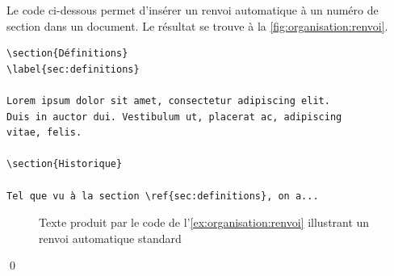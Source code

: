 \begin{exemple}
  \label{ex:organisation:renvoi}
  Le code ci-dessous permet d'insérer un renvoi automatique à un
  numéro de section dans un document. Le résultat se trouve à la
  \autoref{fig:organisation:renvoi}.
\begin{lstlisting}[emph={\label,\ref}]
\section{Définitions}
\label{sec:definitions}

Lorem ipsum dolor sit amet, consectetur adipiscing elit.
Duis in auctor dui. Vestibulum ut, placerat ac, adipiscing
vitae, felis.

\section{Historique}

Tel que vu à la section \ref{sec:definitions}, on a...
\end{lstlisting}

  \begin{figure}
    \caption{Texte produit par le code de
      l'\autoref{ex:organisation:renvoi} illustrant un renvoi
      automatique standard}
    \label{fig:organisation:renvoi}
  \end{figure}
  \qed
\end{exemple}


